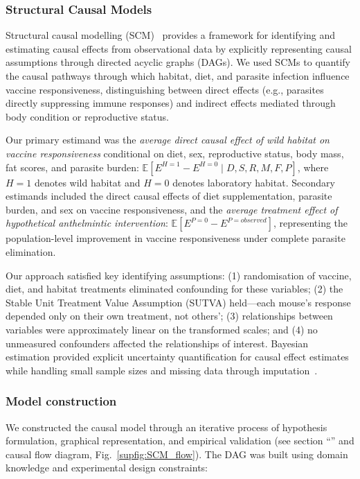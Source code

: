 \documentclass[a4paper, hidelinks, 11pt]{article}
\begin{document}
\subsubsection{Structural Causal Models}

Structural causal modelling (SCM)~\cite{Pearl2009b,Peters2017a} provides a framework for identifying and estimating causal effects from observational data by explicitly representing causal assumptions through directed acyclic graphs (DAGs). We used SCMs to quantify the causal pathways through which habitat, diet, and parasite infection influence vaccine responsiveness, distinguishing between direct effects (e.g., parasites directly suppressing immune responses) and indirect effects mediated through body condition or reproductive status.

Our primary estimand was the \emph{average direct causal effect of wild habitat on vaccine responsiveness} conditional on diet, sex, reproductive status, body mass, fat scores, and parasite burden: $\mathbb{E}[E^{H=1} - E^{H=0} \mid D, S, R, M, F, P]$, where $H=1$ denotes wild habitat and $H=0$ denotes laboratory habitat. Secondary estimands included the direct causal effects of diet supplementation, parasite burden, and sex on vaccine responsiveness, and the \emph{average treatment effect of hypothetical anthelmintic intervention}: $\mathbb{E}[E^{P=0} - E^{P=observed}]$, representing the population-level improvement in vaccine responsiveness under complete parasite elimination.

Our approach satisfied key identifying assumptions: (1) randomisation of vaccine, diet, and habitat treatments eliminated confounding for these variables; (2) the Stable Unit Treatment Value Assumption (SUTVA) held—each mouse's response depended only on their own treatment, not others'; (3) relationships between variables were approximately linear on the transformed scales; and (4) no unmeasured confounders affected the relationships of interest. Bayesian estimation provided explicit uncertainty quantification for causal effect estimates while handling small sample sizes and missing data through imputation~\cite{McElreath2020,Gelman2013}.

\subsubsection{Model construction}\label{sec:construction}

We constructed the causal model through an iterative process of hypothesis formulation, graphical representation, and empirical validation (see section ``'' and causal flow diagram, Fig.~\ref{supfig:SCM_flow}). The DAG was built using domain knowledge and experimental design constraints:
\end{document}
